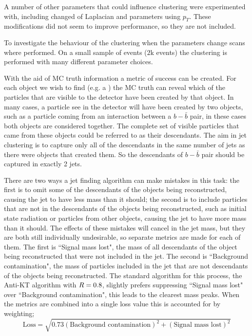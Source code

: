 A number of other parameters that could influence clustering were experimented with,
including changed of Laplacian and parameters using \(p_T\).
These modifications did not seem to improve performance, so they are not included.

To investigate the behaviour of the clustering when the parameters change scans where performed.
On a small sample of events (\(2\)k events) the clustering is performed with many different parameter choices.

With the aid of MC truth information a metric of success can be created.
For each object we wish to find (e.g. a ) 
the MC truth can reveal which of the particles that are visible to the detector have
been created by that object.
In many cases, a particle see in the detector will have been created by two objects,
such as a particle coming from an interaction between a \(b-\bar{b}\) pair,
in these cases both objects are considered together.
The complete set of visible particles that came from these objects could be referred to as their descendants.
The aim in jet clustering is to capture only all of the descendants in the same number of jets as there were objects that created them.
So the descendants of \(b-\bar{b}\) pair should be captured in exactly 2 jets.

There are two ways a jet finding algorithm can make mistakes in this task:
the first is to omit some of the descendants of the objects being reconstructed, causing the jet to have less mass than it should;
the second is to include particles that are not in the descendants of the objects being reconstructed, such as initial state radiation or particles from other objects,
causing the jet to have more mass than it should.
The effects of these mistakes will cancel in the jet mass,
but they are both still individually undesirable,
so separate metrics are made for each of them.
The first is ``Signal mass lost", the mass of all descendants of the object being reconstructed that were not included in the jet.
The second is ``Background contamination", the mass of particles included in the jet that are not descendants of the objects being reconstructed.
The standard algorithm for this process, the Anti-KT algorithm with \(R{}=0.8\), slightly prefers suppressing ``Signal mass lost" over ``Background contamination",
this leads to the clearest mass peaks.
When the metrics are combined into a single loss value this is accounted for by weighting;
\begin{equation}\label{eqn:loss}
\text{Loss} = \sqrt{0.73(\text{Background contamination})^2 + (\text{Signal mass lost})^2}
\end{equation}

